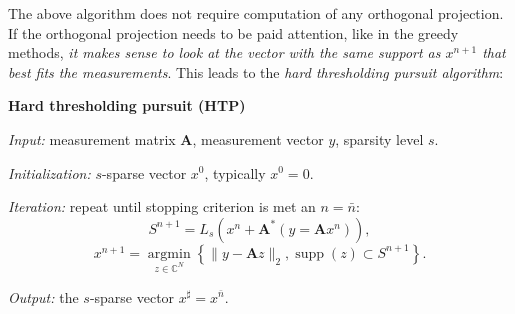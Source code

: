 The above algorithm does not require computation of any orthogonal projection. If the orthogonal projection needs to be paid attention, like in the greedy methods, \emph{\textcolor[rgb]{1,0,0}{it makes sense to look at the vector with the same support as $x^{n+1}$ that best fits the measurements}}. This leads to the \emph{\textcolor[rgb]{1,0,0}{hard thresholding pursuit algorithm}}:
\begin{mdframed}
    \label{HTP}
    \begin{center}
        \textbf{\textcolor[rgb]{1,0,0}{Hard thresholding pursuit (HTP)}}
    \end{center}
    \emph{Input:} measurement matrix $\mathbf{A}$, measurement vector $y$, sparsity level $s$.

    \emph{Initialization:} $s$-sparse vector $x^0$, typically $x^0 = 0$.

    \emph{Iteration:} repeat until stopping criterion is met an $n = \bar{n}$:
    \begin{equation}
        S^{n+1} = L_s(x^n + \mathbf{A}^*(y = \mathbf{A}x^n)), \tag{HTP$_1$}
        \label{eqhtp1}
    \end{equation}
    \begin{equation}
        x^{n+1} = \mathop{\mathrm{argmin}}\limits_{z \in \mathbb{C}^N} \left\{ \|y - \mathbf{A}z\|_2, \mathop{\mathrm{supp}}(z) \subset S^{n+1} \right\}. \tag{HTP$_2$}
        \label{eqhtp2}
    \end{equation}

    \emph{Output:} the $s$-sparse vector $x^{\sharp} = x^{\bar{n}}$.
\end{mdframed}

